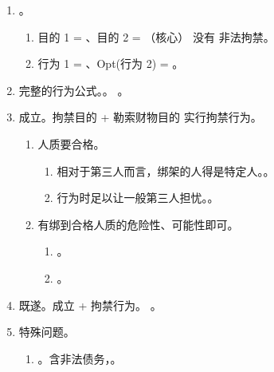 \begin{enumerate}
\begin{enumerate}
          \item {}。
                \begin{enumerate}
                  \item 目的 1 = 、目的 2 = （核心） \yjt 没有 \yjt 非法拘禁。
                  \item 行为 1 = 、Opt(行为 2) = 。
                \end{enumerate}
          \item 完整的行为公式。。
                。
          \item 成立。拘禁目的 + 勒索财物目的 \yjt 实行拘禁行为。
                \begin{enumerate}
                  \item 人质要合格。
                        \begin{enumerate}
                          \item 相对于第三人而言，绑架的人得是特定人。。
                          \item 行为时足以让一般第三人担忧。。
                        \end{enumerate}
                  \item 有绑到合格人质的危险性、可能性即可。
                        \begin{enumerate}
                          \item {}。
                          \item {}。
                        \end{enumerate}
                \end{enumerate}
          \item 既遂。成立 + 拘禁行为。
                。
          \item 特殊问题。
                \begin{enumerate}
                  \item {}。含非法债务，。

\end{enumerate}
\end{enumerate}
\end{enumerate}
